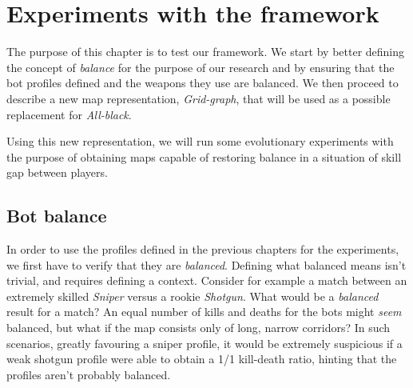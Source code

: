 \chapter{Experiments with the framework}
The purpose of this chapter is to test our framework.
We start by better defining the concept of \textit{balance} for the purpose of our research and by ensuring that the bot profiles defined and the weapons they use are balanced.
We then proceed to describe a new map representation, \textit{Grid-graph}, that will be used as a possible replacement for \textit{All-black}.

Using this new representation, we will run some evolutionary experiments with the purpose of obtaining maps capable of restoring balance in a situation of skill gap between players.

\label{section:bot_balance}
\section{Bot balance}

In order to use the profiles defined in the previous chapters for the experiments, we first have to verify that they are \textit{balanced}. Defining what balanced means isn't trivial, and requires defining a context. Consider for example a match between an extremely skilled \textit{Sniper} versus a rookie \textit{Shotgun}. What would be a \textit{balanced} result for a match? An equal number of kills and deaths for the bots might \textit{seem} balanced, but what if the map consists only of long, narrow corridors? In such scenarios, greatly favouring a sniper profile, it would be extremely suspicious if a weak shotgun profile were able to obtain a 1/1 kill-death ratio, hinting that the profiles aren't probably balanced.

